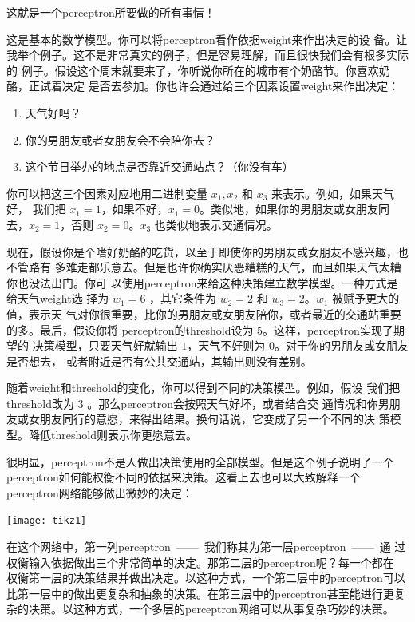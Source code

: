 这就是一个\gls*{perceptron}所要做的所有事情！

这是基本的数学模型。你可以将\gls*{perceptron}看作依据\gls*{weight}来作出决定的设
备。让我举个例子。这不是非常真实的例子，但是容易理解，而且很快我们会有根多实际的
例子。假设这个周末就要来了，你听说你所在的城市有个奶酪节。你喜欢奶酪，正试着决定
是否去参加。你也许会通过给三个因素设置\gls*{weight}来作出决定：
\begin{enumerate}
\item 天气好吗？
\item 你的男朋友或者女朋友会不会陪你去？
\item 这个节日举办的地点是否靠近交通站点？（你没有车）
\end{enumerate}

你可以把这三个因素对应地用二进制变量 $x_1,x_2$ 和 $x_3$ 来表示。例如，如果天气好，
我们把 $x_1 = 1$，如果不好，$x_1 = 0$。类似地，如果你的男朋友或女朋友同去，$x_2
= 1$，否则 $x_2 = 0$。$x_3$ 也类似地表示交通情况。

现在，假设你是个嗜好奶酪的吃货，以至于即使你的男朋友或女朋友不感兴趣，也不管路有
多难走都乐意去。但是也许你确实厌恶糟糕的天气，而且如果天气太糟你也没法出门。你可
以使用\gls*{perceptron}来给这种决策建立数学模型。一种方式是给天气\gls*{weight}选
择为 $w_1 = 6$ ，其它条件为 $w_2 = 2$ 和 $w_3 = 2$。$w_1$ 被赋予更大的值，表示天
气对你很重要，比你的男朋友或女朋友陪你，或者最近的交通站重要的多。最后，假设你将%
\gls*{perceptron}的\gls*{threshold}设为 $5$。这样，\gls*{perceptron}实现了期望的
决策模型，只要天气好就输出 $1$，天气不好则为 $0$。对于你的男朋友或女朋友是否想去，
或者附近是否有公共交通站，其输出则没有差别。

随着\gls*{weight}和\gls*{threshold}的变化，你可以得到不同的决策模型。例如，假设
我们把\gls*{threshold}改为 $3$ 。那么\gls*{perceptron}会按照天气好坏，或者结合交
通情况和你男朋友或女朋友同行的意愿，来得出结果。换句话说，它变成了另一个不同的决
策模型。降低\gls*{threshold}则表示你更愿意去。

很明显，\gls*{perceptron}不是人做出决策使用的全部模型。但是这个例子说明了一个%
\gls*{perceptron}如何能权衡不同的依据来决策。这看上去也可以大致解释一个%
\gls*{perceptron}网络能够做出微妙的决定：
\begin{center}
  \texttt{[image: tikz1]}
\end{center}

在这个网络中，第一列\gls*{perceptron}~——~我们称其为第一层\gls*{perceptron}~——~通
过权衡输入依据做出三个非常简单的决定。那第二层的\gls*{perceptron}呢？每一个都在
权衡第一层的决策结果并做出决定。以这种方式，一个第二层中的\gls*{perceptron}可以
比第一层中的做出更复杂和抽象的决策。在第三层中的\gls*{perceptron}甚至能进行更复
杂的决策。以这种方式，一个多层的\gls*{perceptron}网络可以从事复杂巧妙的决策。

